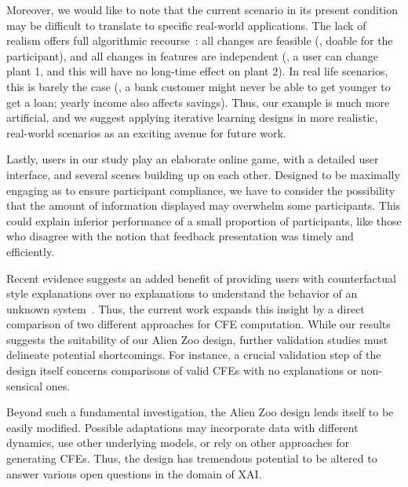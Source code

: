 Moreover, we would like to note that the current scenario in its present condition may be difficult to translate to specific real-world applications.
The lack of realism offers full algorithmic recourse~\citep{karimi_survey_2020}: all changes are feasible (\ie, doable for the participant), and all changes in features are independent (\ie, a user can change plant 1, and this will have no long-time effect on plant 2).
In real life scenarios, this is barely the case (\eg, a bank customer might never be able to get younger to get a loan; yearly income also affects savings). 
Thus, our example is much more artificial, and we suggest applying iterative learning designs in more realistic, real-world scenarios as an exciting avenue for future work.

Lastly, users in our study play an elaborate online game, with a detailed user interface, and several scenes building up on each other.
Designed to be maximally engaging as to ensure participant compliance, we have to consider the possibility that the amount of information displayed may overwhelm some participants.
This could explain inferior performance of a small proportion of participants, like those who disagree with the notion that feedback presentation was timely and efficiently.

Recent evidence suggests an added benefit of providing users with counterfactual style explanations over no explanations to understand the behavior of an unknown system~\citep{van_der_waa_evaluating_2021}.
Thus, the current work expands this insight by a direct comparison of two different approaches for \gls{CFE} computation. 
While our results suggests the suitability of our Alien Zoo design, further validation studies must delineate potential shortcomings.
For instance, a crucial validation step of the design itself concerns comparisons of valid \glspl{CFE} with no explanations or non-sensical ones.

Beyond such a fundamental investigation, the Alien Zoo design lends itself to be easily modified.
Possible adaptations may incorporate data with different dynamics, use other underlying models, or rely on other approaches for generating \glspl{CFE}.
Thus, the design has tremendous potential to be altered to answer various open questions in the domain of \gls{XAI}.

